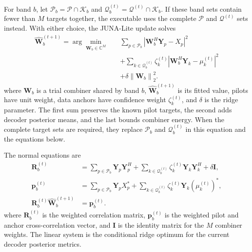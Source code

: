 \documentclass[conference]{IEEEtran}
\newcommand{\C}{\mathbb{C}}
\newcommand{\Kset}{\mathcal{K}}
\newcommand{\Pset}{\mathcal{P}}
\newcommand{\norm}[1]{\left\lVert #1\right\rVert}
\begin{document}
For band \(b\), let \(\Pset_b=\Pset\cap\Kset_b\) and
\(\mathcal Q_b^{(t)}=\mathcal Q^{(t)}\cap\Kset_b\).  If these band sets contain
fewer than \(M\) targets together, the executable uses the complete
\(\Pset\) and \(\mathcal Q^{(t)}\) sets instead.  With either choice, the
JUNA-Lite update solves
\begin{equation}
  \begin{aligned}
  \widehat{\mathbf W}_b^{(t+1)}
  =\arg\min_{\mathbf W_b\in\C^M}\quad
  &\sum_{p\in\Pset_b}
    \left|\mathbf W_b^H\mathbf Y_p-X_p\right|^2\\
  &+\sum_{k\in\mathcal Q_b^{(t)}}\zeta_k^{(t)}
    \left|\mathbf W_b^H\mathbf Y_k-\mu_k^{(t)}\right|^2\\
  &+\delta\norm{\mathbf W_b}_2^2 .
  \end{aligned}
  \label{eq:lite-band-cost}
\end{equation}
where \(\mathbf W_b\) is a trial combiner shared by band \(b\),
\(\widehat{\mathbf W}_b^{(t+1)}\) is its fitted value, pilots have unit weight,
data anchors have confidence weight \(\zeta_k^{(t)}\), and \(\delta\) is the
ridge parameter.  The first sum preserves the known pilot targets, the second
adds decoder posterior means, and the last bounds combiner energy.
When the complete target sets are required, they replace
\(\Pset_b\) and \(\mathcal Q_b^{(t)}\) in this equation and the equations
below.

The normal equations are
\begin{align}
  \mathbf R_b^{(t)}
  &=\sum_{p\in\Pset_b}\mathbf Y_p\mathbf Y_p^H
    +\sum_{k\in\mathcal Q_b^{(t)}}\zeta_k^{(t)}
      \mathbf Y_k\mathbf Y_k^H
    +\delta\mathbf I,
  \label{eq:lite-band-correlation}\\
  \mathbf p_b^{(t)}
  &=\sum_{p\in\Pset_b}\mathbf Y_pX_p^*
    +\sum_{k\in\mathcal Q_b^{(t)}}\zeta_k^{(t)}
      \mathbf Y_k\left(\mu_k^{(t)}\right)^*,
  \label{eq:lite-band-cross}\\
  \mathbf R_b^{(t)}\widehat{\mathbf W}_b^{(t+1)}
  &=\mathbf p_b^{(t)}.
  \label{eq:lite-band-normal}
\end{align}
where \(\mathbf R_b^{(t)}\) is the weighted correlation matrix,
\(\mathbf p_b^{(t)}\) is the weighted pilot and anchor cross-correlation
vector, and \(\mathbf I\) is the identity matrix for the \(M\) combiner
weights.  The linear system is the conditional ridge optimum for the current
decoder posterior metrics.
\end{document}
